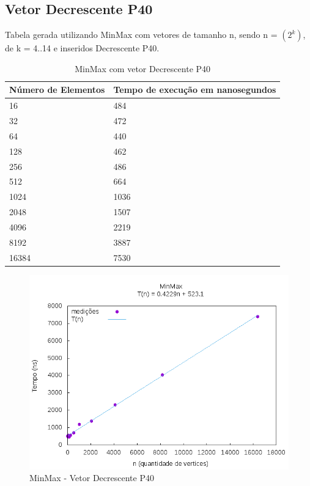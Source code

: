\documentclass[12pt,a4paper,twoside]{report}
\begin{document}
\subsection{Vetor Decrescente P40}
Tabela gerada utilizando MinMax com vetores de tamanho n, sendo n = $(2^k)$, de k = 4..14 e inseridos Decrescente P40.
\begin{table}[H]
\centering
\caption{MinMax com vetor Decrescente P40}
\label{my-label}
\begin{tabular}{|l|l|}
\hline
\multicolumn{1}{|c|}{\textbf{Número de Elementos}} & \multicolumn{1}{c|}{\textbf{Tempo de execução em nanosegundos}} \\ \hline
16 & 484 \\ \hline
32 & 472 \\ \hline
64 & 440 \\ \hline
128 & 462 \\ \hline
256 & 486 \\ \hline
512 & 664 \\ \hline
1024 & 1036 \\ \hline
2048 & 1507 \\ \hline
4096 & 2219 \\ \hline
8192 & 3887 \\ \hline
16384 & 7530 \\ \hline
\end{tabular}
\end{table}

\begin{figure}[H]
    \centering
    \includegraphics[width=0.7\linewidth]{graficos/Min Max/Decrescente P40/MinMax.png}
  \caption{MinMax - Vetor Decrescente P40}
\end{figure}
\end{document}
